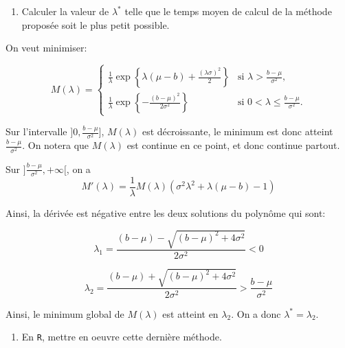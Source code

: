 \documentclass[
]{article}
\providecommand{\tightlist}{%
  \setlength{\itemsep}{0pt}\setlength{\parskip}{0pt}}
\newenvironment{Correction}%
  { \vspace{\baselineskip}\begin{mdframed}[backgroundcolor=my_green]}%
  {\end{mdframed}}
\begin{document}
\begin{enumerate}
\def\labelenumi{\arabic{enumi}.}
\setcounter{enumi}{4}
\tightlist
\item
  Calculer la valeur de \(\lambda^*\) telle que le temps moyen de calcul
  de la méthode proposée soit le plus petit possible.
\end{enumerate}

\begin{Correction}
On veut minimiser:

$$M(\lambda) = \left\lbrace
\begin{array}{lr}
\frac{1}{\lambda}\exp\left\lbrace
    \lambda(\mu-b)+\frac{(\lambda\sigma)^2}{2}
    \right\rbrace & \text{si } \lambda > \frac{b - \mu}{\sigma^2},\\
    \frac{1}{\lambda}\exp\left\lbrace
    -\frac{(b-\mu)^2}{2\sigma^2}
    \right\rbrace & \text{si } 0< \lambda \leq \frac{b - \mu}{\sigma^2}.
\end{array}
\right. $$

Sur l'intervalle $]0, \frac{b - \mu}{\sigma^2}]$, $M(\lambda)$ est décroissante,
le minimum est donc atteint $\frac{b - \mu}{\sigma^2}$. On notera que
$M(\lambda)$ est continue en ce point, et donc continue partout.

Sur $]\frac{b - \mu}{\sigma^2}, +\infty[$, on a
$$M'(\lambda) = \frac{1}{\lambda}M(\lambda)\left(\sigma^2 \lambda^2 + \lambda(\mu -b) - 1\right)$$

Ainsi, la dérivée est négative entre les deux solutions du polynôme qui sont:

$$\lambda_1 = \frac{(b - \mu) - \sqrt{(b-\mu)^2 + 4\sigma^2}}{2 \sigma^2} < 0$$

$$\lambda_2 = \frac{(b - \mu) + \sqrt{(b-\mu)^2 + 4\sigma^2}}{2 \sigma^2} > \frac{b - \mu}{\sigma^2}$$

Ainsi, le minimum global de $M(\lambda)$ est atteint en $\lambda_2$.
On a donc $\lambda^* = \lambda_2$.
\end{Correction}

\begin{enumerate}
\def\labelenumi{\arabic{enumi}.}
\setcounter{enumi}{5}
\tightlist
\item
  En \texttt{R}, mettre en oeuvre cette dernière méthode.
\end{enumerate}
\end{document}
